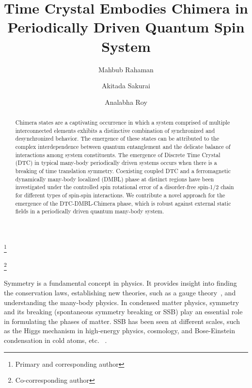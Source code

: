 \documentclass[%
reprint,
superscriptaddress,
amsmath,amssymb,showkeys,
aps,
prb,
]{revtex4-2}
\begin{document}
	
	\title{Time Crystal Embodies Chimera in Periodically Driven Quantum Spin System}
	
	\author{Mahbub Rahaman}
	\thanks{Primary and corresponding author}
	\author{Akitada Sakurai}
	\author{Analabha Roy}
	\thanks{Co-corresponding author}

	\begin{abstract}
		Chimera states are a captivating occurrence in which a system comprised of multiple interconnected elements exhibits a distinctive combination of synchronized and desynchronized behavior. The emergence of these states can be attributed to the complex interdependence between quantum entanglement and the delicate balance of interactions among system constituents. The emergence of Discrete Time Crystal (DTC) in typical many-body periodically driven systems occurs when there is a breaking of time translation symmetry. Coexisting coupled DTC and a ferromagnetic dynamically many-body localized (DMBL) phase at distinct regions have been investigated under the controlled spin rotational error of a disorder-free spin-1/2 chain for different types of spin-spin interactions. We contribute a novel approach for the emergence of the DTC-DMBL-Chimera phase, which is robust against external static fields in a periodically driven quantum many-body system.
	\end{abstract}
	
	\maketitle
	
	Symmetry is a fundamental concept in physics. It provides insight into finding the conservation laws, establishing new theories, such as a gauge theory~\cite{Yang_1954}, and understanding the many-body physics. In condensed matter physics, symmetry and its breaking (spontaneous symmetry breaking or SSB) play an essential role in formulating the phases of matter. SSB has been seen at different scales, such as the Higgs mechanism in high-energy physics, cosmology, and Bose-Einstein condensation in cold atoms, etc. ~\cite{krasnov_spontaneous_2012, sadler_spontaneous_2006, vanderbruggen_spontaneous_2015}.
	
\end{document}
